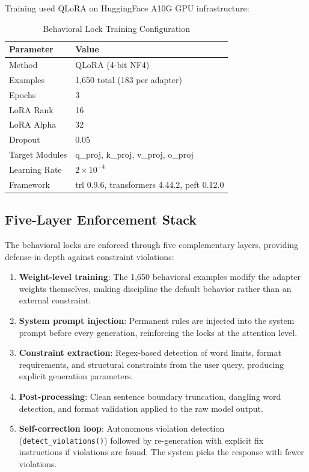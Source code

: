 Training used QLoRA on HuggingFace A10G GPU infrastructure:

\begin{table}[h]
\centering
\caption{Behavioral Lock Training Configuration}
\label{tab:lock-training}
\begin{tabular}{ll}
\toprule
\textbf{Parameter} & \textbf{Value} \\
\midrule
Method       & QLoRA (4-bit NF4) \\
Examples     & 1,650 total (183 per adapter) \\
Epochs       & 3 \\
LoRA Rank    & 16 \\
LoRA Alpha   & 32 \\
Dropout      & 0.05 \\
Target Modules & q\_proj, k\_proj, v\_proj, o\_proj \\
Learning Rate  & $2 \times 10^{-4}$ \\
Framework    & trl 0.9.6, transformers 4.44.2, peft 0.12.0 \\
\bottomrule
\end{tabular}
\end{table}

\subsection{Five-Layer Enforcement Stack}

The behavioral locks are enforced through five complementary layers, providing
defense-in-depth against constraint violations:

\begin{enumerate}
    \item \textbf{Weight-level training}: The 1,650 behavioral examples
    modify the adapter weights themselves, making discipline the default
    behavior rather than an external constraint.

    \item \textbf{System prompt injection}: Permanent rules are injected into
    the system prompt before every generation, reinforcing the locks at the
    attention level.

    \item \textbf{Constraint extraction}: Regex-based detection of word
    limits, format requirements, and structural constraints from the user
    query, producing explicit generation parameters.

    \item \textbf{Post-processing}: Clean sentence boundary truncation,
    dangling word detection, and format validation applied to the raw model
    output.

    \item \textbf{Self-correction loop}: Autonomous violation detection
    (\texttt{detect\_violations()}) followed by re-generation with explicit
    fix instructions if violations are found. The system picks the response
    with fewer violations.
\end{enumerate}

